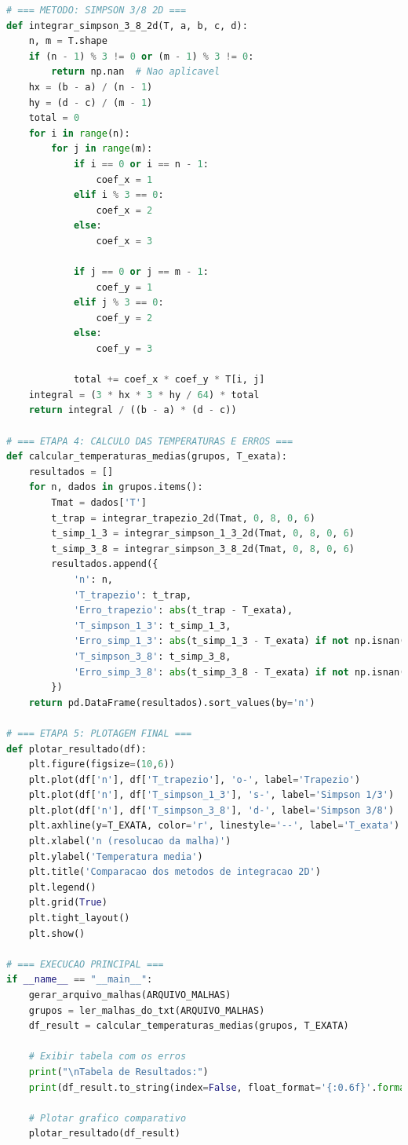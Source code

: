 \documentclass[12pt]{article}
\begin{document}
\begin{lstlisting}[language=Python, caption={Funcao principal que executa os calculos e organiza os resultados.}]
# === METODO: SIMPSON 3/8 2D ===
def integrar_simpson_3_8_2d(T, a, b, c, d):
    n, m = T.shape
    if (n - 1) % 3 != 0 or (m - 1) % 3 != 0:
        return np.nan  # Nao aplicavel
    hx = (b - a) / (n - 1)
    hy = (d - c) / (m - 1)
    total = 0
    for i in range(n):
        for j in range(m):
            if i == 0 or i == n - 1:
                coef_x = 1
            elif i % 3 == 0:
                coef_x = 2
            else:
                coef_x = 3

            if j == 0 or j == m - 1:
                coef_y = 1
            elif j % 3 == 0:
                coef_y = 2
            else:
                coef_y = 3

            total += coef_x * coef_y * T[i, j]
    integral = (3 * hx * 3 * hy / 64) * total
    return integral / ((b - a) * (d - c))

# === ETAPA 4: CALCULO DAS TEMPERATURAS E ERROS ===
def calcular_temperaturas_medias(grupos, T_exata):
    resultados = []
    for n, dados in grupos.items():
        Tmat = dados['T']
        t_trap = integrar_trapezio_2d(Tmat, 0, 8, 0, 6)
        t_simp_1_3 = integrar_simpson_1_3_2d(Tmat, 0, 8, 0, 6)
        t_simp_3_8 = integrar_simpson_3_8_2d(Tmat, 0, 8, 0, 6)
        resultados.append({
            'n': n,
            'T_trapezio': t_trap,
            'Erro_trapezio': abs(t_trap - T_exata),
            'T_simpson_1_3': t_simp_1_3,
            'Erro_simp_1_3': abs(t_simp_1_3 - T_exata) if not np.isnan(t_simp_1_3) else np.nan,
            'T_simpson_3_8': t_simp_3_8,
            'Erro_simp_3_8': abs(t_simp_3_8 - T_exata) if not np.isnan(t_simp_3_8) else np.nan
        })
    return pd.DataFrame(resultados).sort_values(by='n')

# === ETAPA 5: PLOTAGEM FINAL ===
def plotar_resultado(df):
    plt.figure(figsize=(10,6))
    plt.plot(df['n'], df['T_trapezio'], 'o-', label='Trapezio')
    plt.plot(df['n'], df['T_simpson_1_3'], 's-', label='Simpson 1/3')
    plt.plot(df['n'], df['T_simpson_3_8'], 'd-', label='Simpson 3/8')
    plt.axhline(y=T_EXATA, color='r', linestyle='--', label='T_exata')
    plt.xlabel('n (resolucao da malha)')
    plt.ylabel('Temperatura media')
    plt.title('Comparacao dos metodos de integracao 2D')
    plt.legend()
    plt.grid(True)
    plt.tight_layout()
    plt.show()

# === EXECUCAO PRINCIPAL ===
if __name__ == "__main__":
    gerar_arquivo_malhas(ARQUIVO_MALHAS)
    grupos = ler_malhas_do_txt(ARQUIVO_MALHAS)
    df_result = calcular_temperaturas_medias(grupos, T_EXATA)

    # Exibir tabela com os erros
    print("\nTabela de Resultados:")
    print(df_result.to_string(index=False, float_format='{:0.6f}'.format))

    # Plotar grafico comparativo
    plotar_resultado(df_result)

\end{lstlisting}
\end{document}
